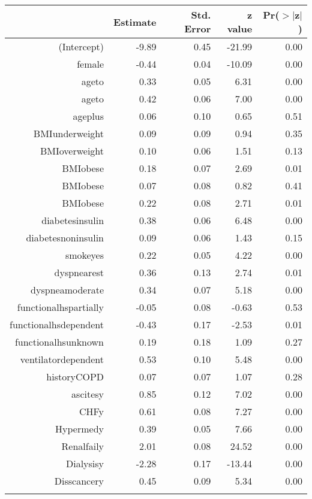 \bigskip\bigskip
\centering
\begin{tabular}{rrrrr}
  \hline
 & Estimate & Std. Error & z value & Pr($>$$|$z$|$) \\ 
  \hline
(Intercept) & -9.89 & 0.45 & -21.99 & 0.00 \\ 
  female & -0.44 & 0.04 & -10.09 & 0.00 \\ 
  age\-65\-to\-74 & 0.33 & 0.05 & 6.31 & 0.00 \\ 
  age\-75\-to\-84 & 0.42 & 0.06 & 7.00 & 0.00 \\ 
  age\-85\-plus & 0.06 & 0.10 & 0.65 & 0.51 \\ 
  BMI\-underweight & 0.09 & 0.09 & 0.94 & 0.35 \\ 
  BMI\-overweight & 0.10 & 0.06 & 1.51 & 0.13 \\ 
  BMI\-obese\-1 & 0.18 & 0.07 & 2.69 & 0.01 \\ 
  BMI\-obese\-2 & 0.07 & 0.08 & 0.82 & 0.41 \\ 
  BMI\-obese\-3 & 0.22 & 0.08 & 2.71 & 0.01 \\ 
  diabetes\-insulin & 0.38 & 0.06 & 6.48 & 0.00 \\ 
  diabetes\-noninsulin & 0.09 & 0.06 & 1.43 & 0.15 \\ 
  smoke\-yes & 0.22 & 0.05 & 4.22 & 0.00 \\ 
  dyspnea\-rest & 0.36 & 0.13 & 2.74 & 0.01 \\ 
  dyspnea\-moderate & 0.34 & 0.07 & 5.18 & 0.00 \\ 
  functional\-hs\-partially & -0.05 & 0.08 & -0.63 & 0.53 \\ 
  functional\-hs\-dependent & -0.43 & 0.17 & -2.53 & 0.01 \\ 
  functional\-hs\-unknown & 0.19 & 0.18 & 1.09 & 0.27 \\ 
  ventilator\-dependent & 0.53 & 0.10 & 5.48 & 0.00 \\ 
  history\-COPD & 0.07 & 0.07 & 1.07 & 0.28 \\ 
  ascites\-y & 0.85 & 0.12 & 7.02 & 0.00 \\ 
  CHF\-y & 0.61 & 0.08 & 7.27 & 0.00 \\ 
  Hyper\-med\-y & 0.39 & 0.05 & 7.66 & 0.00 \\ 
  Renal\-fail\-y & 2.01 & 0.08 & 24.52 & 0.00 \\ 
  Dialysis\-y & -2.28 & 0.17 & -13.44 & 0.00 \\ 
  Diss\-cancer\-y & 0.45 & 0.09 & 5.34 & 0.00 \\ 
$$
\end{tabular}

